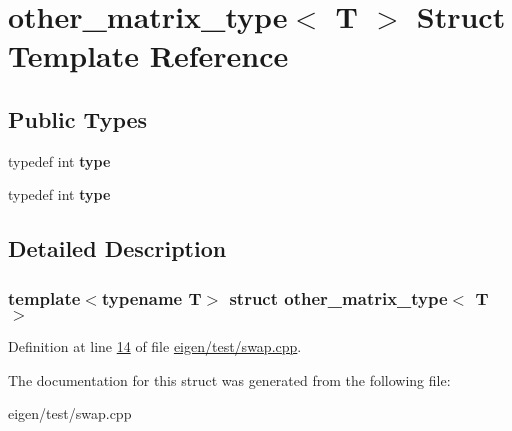 \hypertarget{structother__matrix__type}{}\section{other\+\_\+matrix\+\_\+type$<$ T $>$ Struct Template Reference}
\label{structother__matrix__type}
\subsection*{Public Types}
\begin{DoxyCompactItemize}
\item 
\mbox{\label{structother__matrix__type_a15baa0ed0b7ae722eb43245482010393}} 
typedef int {\bfseries type}
\item 
\mbox{\label{structother__matrix__type_a15baa0ed0b7ae722eb43245482010393}} 
typedef int {\bfseries type}
\end{DoxyCompactItemize}


\subsection{Detailed Description}
\subsubsection*{template$<$typename T$>$\newline
struct other\+\_\+matrix\+\_\+type$<$ T $>$}



Definition at line \hyperlink{eigen_2test_2swap_8cpp_source_l00014}{14} of file \hyperlink{eigen_2test_2swap_8cpp_source}{eigen/test/swap.\+cpp}.



The documentation for this struct was generated from the following file\+:\begin{DoxyCompactItemize}
\item 
eigen/test/swap.\+cpp\end{DoxyCompactItemize}
